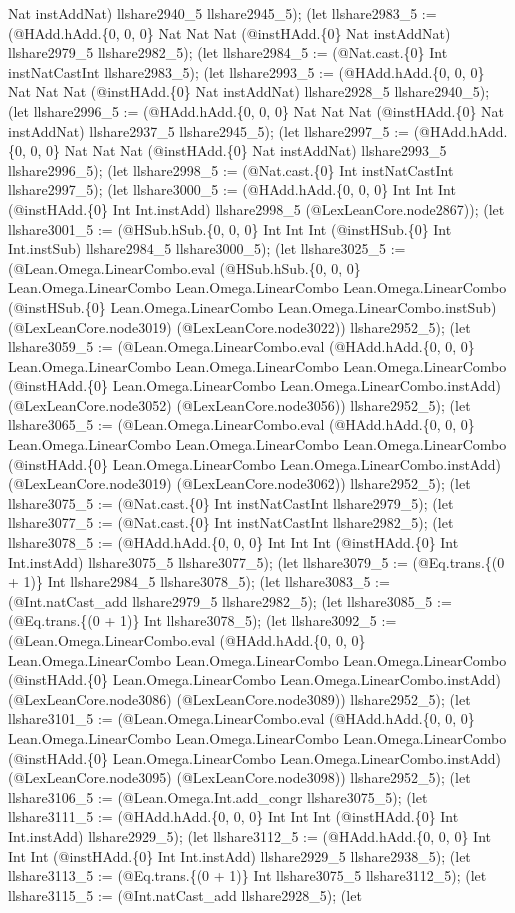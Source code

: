 \documentclass[11pt]{article}
\begin{document}
Nat instAddNat) llshare2940\_5 llshare2945\_5); (let llshare2983\_5 := (@HAdd.hAdd.\{0, 0, 0\} Nat Nat Nat (@instHAdd.\{0\} Nat instAddNat) llshare2979\_5 llshare2982\_5); (let llshare2984\_5 := (@Nat.cast.\{0\} Int instNatCastInt llshare2983\_5); (let llshare2993\_5 := (@HAdd.hAdd.\{0, 0, 0\} Nat Nat Nat (@instHAdd.\{0\} Nat instAddNat) llshare2928\_5 llshare2940\_5); (let llshare2996\_5 := (@HAdd.hAdd.\{0, 0, 0\} Nat Nat Nat (@instHAdd.\{0\} Nat instAddNat) llshare2937\_5 llshare2945\_5); (let llshare2997\_5 := (@HAdd.hAdd.\{0, 0, 0\} Nat Nat Nat (@instHAdd.\{0\} Nat instAddNat) llshare2993\_5 llshare2996\_5); (let llshare2998\_5 := (@Nat.cast.\{0\} Int instNatCastInt llshare2997\_5); (let llshare3000\_5 := (@HAdd.hAdd.\{0, 0, 0\} Int Int Int (@instHAdd.\{0\} Int Int.instAdd) llshare2998\_5 (@LexLeanCore.node2867)); (let llshare3001\_5 := (@HSub.hSub.\{0, 0, 0\} Int Int Int (@instHSub.\{0\} Int Int.instSub) llshare2984\_5 llshare3000\_5); (let llshare3025\_5 := (@Lean.Omega.LinearCombo.eval (@HSub.hSub.\{0, 0, 0\} Lean.Omega.LinearCombo Lean.Omega.LinearCombo Lean.Omega.LinearCombo (@instHSub.\{0\} Lean.Omega.LinearCombo Lean.Omega.LinearCombo.instSub) (@LexLeanCore.node3019) (@LexLeanCore.node3022)) llshare2952\_5); (let llshare3059\_5 := (@Lean.Omega.LinearCombo.eval (@HAdd.hAdd.\{0, 0, 0\} Lean.Omega.LinearCombo Lean.Omega.LinearCombo Lean.Omega.LinearCombo (@instHAdd.\{0\} Lean.Omega.LinearCombo Lean.Omega.LinearCombo.instAdd) (@LexLeanCore.node3052) (@LexLeanCore.node3056)) llshare2952\_5); (let llshare3065\_5 := (@Lean.Omega.LinearCombo.eval (@HAdd.hAdd.\{0, 0, 0\} Lean.Omega.LinearCombo Lean.Omega.LinearCombo Lean.Omega.LinearCombo (@instHAdd.\{0\} Lean.Omega.LinearCombo Lean.Omega.LinearCombo.instAdd) (@LexLeanCore.node3019) (@LexLeanCore.node3062)) llshare2952\_5); (let llshare3075\_5 := (@Nat.cast.\{0\} Int instNatCastInt llshare2979\_5); (let llshare3077\_5 := (@Nat.cast.\{0\} Int instNatCastInt llshare2982\_5); (let llshare3078\_5 := (@HAdd.hAdd.\{0, 0, 0\} Int Int Int (@instHAdd.\{0\} Int Int.instAdd) llshare3075\_5 llshare3077\_5); (let llshare3079\_5 := (@Eq.trans.\{(0 + 1)\} Int llshare2984\_5 llshare3078\_5); (let llshare3083\_5 := (@Int.natCast\_add llshare2979\_5 llshare2982\_5); (let llshare3085\_5 := (@Eq.trans.\{(0 + 1)\} Int llshare3078\_5); (let llshare3092\_5 := (@Lean.Omega.LinearCombo.eval (@HAdd.hAdd.\{0, 0, 0\} Lean.Omega.LinearCombo Lean.Omega.LinearCombo Lean.Omega.LinearCombo (@instHAdd.\{0\} Lean.Omega.LinearCombo Lean.Omega.LinearCombo.instAdd) (@LexLeanCore.node3086) (@LexLeanCore.node3089)) llshare2952\_5); (let llshare3101\_5 := (@Lean.Omega.LinearCombo.eval (@HAdd.hAdd.\{0, 0, 0\} Lean.Omega.LinearCombo Lean.Omega.LinearCombo Lean.Omega.LinearCombo (@instHAdd.\{0\} Lean.Omega.LinearCombo Lean.Omega.LinearCombo.instAdd) (@LexLeanCore.node3095) (@LexLeanCore.node3098)) llshare2952\_5); (let llshare3106\_5 := (@Lean.Omega.Int.add\_congr llshare3075\_5); (let llshare3111\_5 := (@HAdd.hAdd.\{0, 0, 0\} Int Int Int (@instHAdd.\{0\} Int Int.instAdd) llshare2929\_5); (let llshare3112\_5 := (@HAdd.hAdd.\{0, 0, 0\} Int Int Int (@instHAdd.\{0\} Int Int.instAdd) llshare2929\_5 llshare2938\_5); (let llshare3113\_5 := (@Eq.trans.\{(0 + 1)\} Int llshare3075\_5 llshare3112\_5); (let llshare3115\_5 := (@Int.natCast\_add llshare2928\_5); (let 
\end{document}
